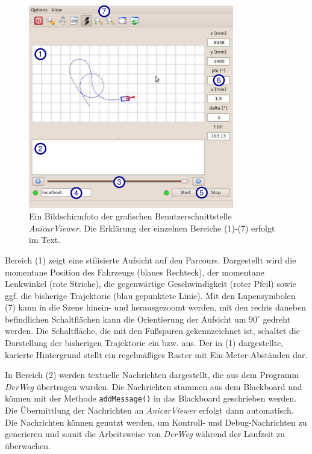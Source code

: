 \documentclass[a4paper, 11pt]{article}
\newcommand{\code}[1]{\texttt{#1}}
\newcommand{\DerWeg}{\textit{DerWeg }}  %
\newcommand{\AnicarViewer}{\textit{AnicarViewer }}  %
\begin{document}
{\begin{figure}
\centering
\includegraphics[width=0.8\textwidth]{anicarviewer}
\caption{Ein Bildschirmfoto der grafischen Benutzerschnittstelle \textit{AnicarViewer}. Die Erklärung der einzelnen Bereiche (1)-(7) erfolgt im Text.}
\label{fig:AnicarViewerSnapshot}
\end{figure}

Bereich (1) zeigt eine stilisierte Aufsicht auf den Parcours. Dargestellt wird die momentane Position des Fahrzeugs (blaues Rechteck), der momentane Lenkwinkel (rote Striche), die gegenwärtige Geschwindigkeit (roter Pfeil) sowie ggf. die bisherige Trajektorie (blau gepunktete Linie). Mit den Lupensymbolen (7) kann in die Szene hinein- und herausgezoomt werden, mit den rechts daneben befindlichen Schaltflächen kann die Orientierung der Aufsicht um $90^\circ$ gedreht werden. Die Schaltfläche, die mit den Fußspuren gekennzeichnet ist, schaltet die Darstellung der bisherigen Trajektorie ein bzw. aus. Der in (1) dargestellte, karierte Hintergrund stellt ein regelmäßiges Raster mit Ein-Meter-Abständen dar.

In Bereich (2) werden textuelle Nachrichten dargestellt, die aus dem Programm \DerWeg übertragen wurden. Die Nachrichten stammen aus dem Blackboard und können mit der Methode \code{addMessage()} in das Blackboard geschrieben werden. Die Übermittlung der Nachrichten an \AnicarViewer erfolgt dann automatisch. Die Nachrichten können genutzt werden, um Kontroll- und Debug-Nachrichten zu generieren und somit die Arbeitsweise von \DerWeg während der Laufzeit zu überwachen.

}
\end{document}
